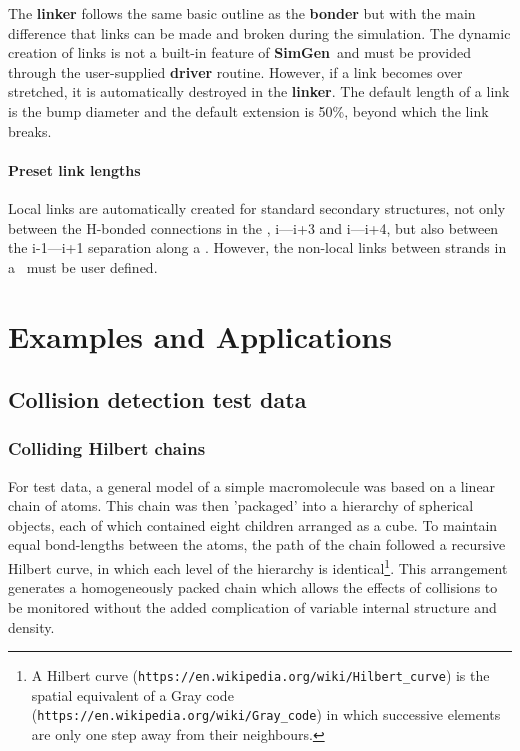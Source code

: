 \documentclass[review]{elsarticle}
\newcommand{\TT}[1]{{\ttfamily\bfseries #1}}
\newcommand{\NAME}{{\TT{SimGen}}}
\begin{document}
{{{{{The \TT{linker} follows the same basic outline as the \TT{bonder} but with the main
difference that links can be made and broken during the simulation.   The dynamic creation
of links is not a built-in feature of \NAME\ and must be provided through the user-supplied
\TT{driver} routine.   However, if a link becomes over stretched, it is automatically destroyed in
the \TT{linker}.    The default length of a link is the bump diameter and the default extension
is 50\%, beyond which the link breaks.

\paragraph{Preset link lengths}

Local links are automatically created for standard secondary structures,  not only between the H-bonded
connections in the \AH, i---i+3 and i---i+4, but also between the i-1---i+1 separation along a \Bs.
However, the non-local links between strands in a \BS\ must be user defined.

\clearpage
\section{Examples and Applications}

\subsection{Collision detection test data}

\subsubsection{Colliding Hilbert chains}

For test data,
a general model of a simple macromolecule was based on a linear chain of atoms.
This chain was then 'packaged' into a hierarchy of spherical objects, each of which contained
eight children arranged as a cube.   To maintain equal bond-lengths between the atoms, the path of the
chain followed a recursive Hilbert curve, in which each level of the hierarchy is identical\footnote{
A Hilbert curve ({\tt https://en.wikipedia.org/wiki/Hilbert\_curve}) is the spatial equivalent of a 
Gray code ({\tt https://en.wikipedia.org/wiki/Gray\_code}) in which successive elements are
only one step away from their neighbours.
}.   This arrangement generates a homogeneously packed chain which allows the effects of
collisions to be monitored without the added complication of variable internal structure and density.

}}}}}
\end{document}

